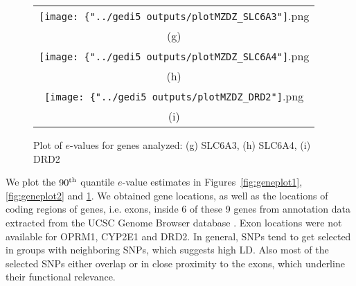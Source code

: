 \begin{figure}
\begin{center}

\begin{tabular}{c}
		\texttt{[image: \{"../gedi5 outputs/plotMZDZ\_SLC6A3"]}.png}\\
		(g)\\
		\texttt{[image: \{"../gedi5 outputs/plotMZDZ\_SLC6A4"]}.png} \\
		(h)\\	
		\texttt{[image: \{"../gedi5 outputs/plotMZDZ\_DRD2"]}.png}\\
		(i)\\	
\end{tabular}

\caption{Plot of $e$-values for genes analyzed: (g) SLC6A3, (h) SLC6A4, (i) DRD2}
\label{fig:geneplot3}

\end{center}
\end{figure}

We plot the $90^{\operatorname*{th}}$ quantile $e$-value estimates in Figures~\ref{fig:geneplot1}, \ref{fig:geneplot2} and \ref{fig:geneplot3}. We obtained gene locations, as well as the locations of coding regions of genes, i.e. exons, inside 6 of these 9 genes from annotation data extracted from the UCSC Genome Browser database \citep{UCSCdata}. Exon locations were not available for OPRM1, CYP2E1 and DRD2. In general, SNPs tend to get selected in groups with neighboring SNPs, which suggests high LD. Also most of the selected SNPs either overlap or in close proximity to the exons, which underline their functional relevance.